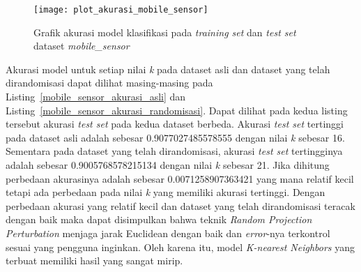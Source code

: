 \begin{figure}
	\centering
	\texttt{[image: plot\_akurasi\_mobile\_sensor]}
	\caption{Grafik akurasi model klasifikasi pada \textit{training set} dan \textit{test set} dataset \textit{mobile\_sensor}}
	\label{fig:plot_akurasi_mobile_sensor}
\end{figure}

Akurasi model untuk setiap nilai \textit{k} pada dataset asli dan dataset yang telah dirandomisasi dapat dilihat masing-masing pada Listing~\ref{mobile_sensor_akurasi_asli} dan Listing~\ref{mobile_sensor_akurasi_randomisasi}. Dapat dilihat pada kedua listing tersebut akurasi \textit{test set} pada kedua dataset berbeda. Akurasi \textit{test set} tertinggi pada dataset asli adalah sebesar 0.9077027485578555 dengan nilai \textit{k} sebesar 16. Sementara pada dataset yang telah dirandomisasi, akurasi \textit{test set} tertingginya adalah sebesar 0.9005768578215134 dengan nilai \textit{k} sebesar 21. Jika dihitung perbedaan akurasinya adalah sebesar 0.0071258907363421 yang mana relatif kecil tetapi ada perbedaan pada nilai \textit{k} yang memiliki akurasi tertinggi. Dengan perbedaan akurasi yang relatif kecil dan dataset yang telah dirandomisasi teracak dengan baik maka dapat disimpulkan bahwa teknik \textit{Random Projection Perturbation} menjaga jarak Euclidean dengan baik dan \textit{error}-nya terkontrol sesuai yang pengguna inginkan. Oleh karena itu, model \textit{K-nearest Neighbors} yang terbuat memiliki hasil yang sangat mirip. 

